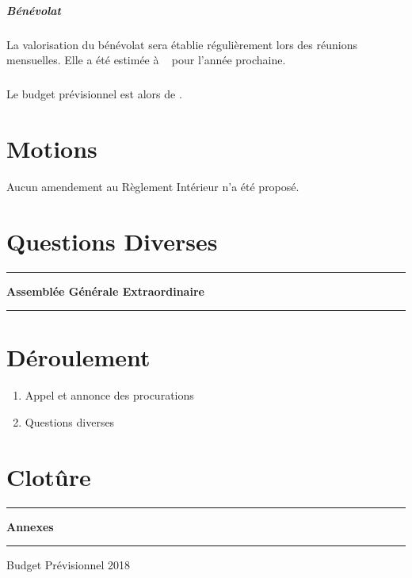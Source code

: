 \documentclass[11pt]{article}
\begin{document}
\subparagraph{Bénévolat}La valorisation du bénévolat sera établie régulièrement lors des réunions mensuelles.
Elle a été estimée à \officialeuro~ pour l'année prochaine.

\subparagraph{}Le budget prévisionnel est alors de \officialeuro.

\section{Motions}
Aucun amendement au Règlement Intérieur n'a été proposé.

\section{Questions Diverses}

\newpage

\hrule
\vspace{.3cm}
\begin{center}
\Large\bfseries Assemblée Générale Extraordinaire
\end{center}
\vspace{.3cm}
\hrule

\vspace{1.5cm}

\section*{Déroulement}

\begin{enumerate}
    \item Appel et annonce des procurations
		\item Questions diverses
\end{enumerate}

\section*{Clotûre}

\newpage

\clearpage
\thispagestyle{empty}
\vspace*{\fill}
\begin{center}
\hrule
\vspace{.3cm}
\Huge\bfseries Annexes
\vspace{.3cm}
\hrule
\vspace{2cm}
\Large
\noindent Budget Prévisionnel 2018
\end{center}
\vspace*{\fill}


\end{document}
